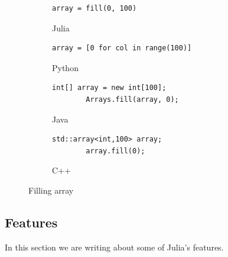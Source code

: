\documentclass[a4paper, 11pt, titlepage]{article}
\begin{document}
\begin{figure}[H]
	\centering
	\begin{subfigure}[H]{0.7\textwidth}
		\centering
		\begin{lstlisting}[belowskip=0.5mm]
		array = fill(0, 100)
		\end{lstlisting}
		\caption{Julia}
	\end{subfigure}
	\begin{subfigure}[H]{0.7\textwidth}
		\centering
		\begin{lstlisting}[belowskip=0.5mm]
		array = [0 for col in range(100)]
		\end{lstlisting}
		\caption{Python}
	\end{subfigure}	
	\begin{subfigure}[H]{0.7\textwidth}
		\centering
		\begin{lstlisting}[belowskip=0.5mm]
		int[] array = new int[100];
		Arrays.fill(array, 0);
		\end{lstlisting}
		\caption{Java}
	\end{subfigure}
	\begin{subfigure}[H]{0.7\textwidth}
		\centering
		\begin{lstlisting}[belowskip=0.5mm]
		std::array<int,100> array;
		array.fill(0);
		\end{lstlisting}
		\caption{C++}
	\end{subfigure}
	\caption{Filling array}
	\label{Filling array with 0's}
\end{figure}

\subsection{Features}
In this section we are writing about some of Julia's features.
\end{document}
